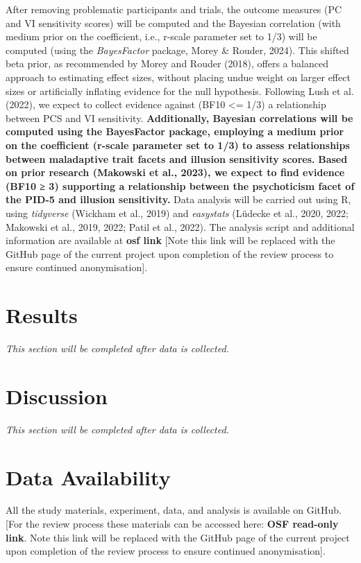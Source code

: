 \documentclass[
  man,
  floatsintext,
  longtable,
  nolmodern,
  notxfonts,
  notimes,
  colorlinks=true,linkcolor=blue,citecolor=blue,urlcolor=blue]{apa7}
\begin{document}
After removing problematic participants and trials, the outcome measures
(PC and VI sensitivity scores) will be computed and the Bayesian
correlation (with medium prior on the coefficient, i.e., r-scale
parameter set to 1/3) will be computed (using the \emph{BayesFactor}
package, Morey \& Rouder, 2024). This shifted beta prior, as recommended
by Morey and Rouder (2018), offers a balanced approach to estimating
effect sizes, without placing undue weight on larger effect sizes or
artificially inflating evidence for the null hypothesis. Following Lush
et al. (2022), we expect to collect evidence against (BF10 \textless=
1/3) a relationship between PCS and VI sensitivity.
\textbf{Additionally, Bayesian correlations will be computed using the
BayesFactor package, employing a medium prior on the coefficient
(r-scale parameter set to 1/3) to assess relationships between
maladaptive trait facets and illusion sensitivity scores.} \textbf{Based
on prior research (Makowski et al., 2023), we expect to find evidence
(BF10 ≥ 3) supporting a relationship between the psychoticism facet of
the PID-5 and illusion sensitivity.} Data analysis will be carried out
using R, using \emph{tidyverse} (Wickham et al., 2019) and
\emph{easystats} (Lüdecke et al., 2020, 2022; Makowski et al., 2019,
2022; Patil et al., 2022). The analysis script and additional
information are available at \textbf{osf link} {[}Note this link will be
replaced with the GitHub page of the current project upon completion of
the review process to ensure continued anonymisation{]}.

\section{Results}\label{results}

\emph{This section will be completed after data is collected.}

\section{Discussion}\label{discussion}

\emph{This section will be completed after data is collected.}

\section{Data Availability}\label{data-availability}

All the study materials, experiment, data, and analysis is available on
GitHub. {[}For the review process these materials can be accessed here:
\textbf{OSF read-only link}. Note this link will be replaced with the
GitHub page of the current project upon completion of the review process
to ensure continued anonymisation{]}.
\end{document}
